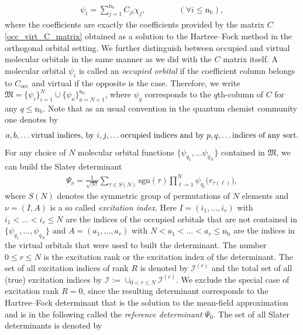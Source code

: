 \documentclass[reqno]{amsart}
\begin{document}
\begin{align}
    \psi_i=\sum_{j=1}^{\text{n}_\text{b}}C_{ji}\chi_j,\qquad \qquad(\forall i\le \text{n}_\text{b}),
\end{align}
where the coefficients are exactly the coefficients provided by the matrix $C$ \eqref{occ_virt_C_matrix} obtained as a solution to the Hartree–Fock method in the orthogonal orbital setting. We further distinguish between occupied and virtual molecular orbitals in the same manner as we did with the $C$ matrix itself. A molecular orbital $\psi_i$ is called an \textit{occupied orbital} if the coefficient column belongs to $C_{\text{occ}}$ and virtual if the opposite is the case. Therefore, we write $\mathfrak{M}=\lbrace \psi_i\rbrace_{i=1}^{N}\cup\lbrace \psi_a\rbrace_{a=N+1}^{\text{n}_\text{b}}$, where $\psi_q$ corresponds to the $q$th-column of $C$ for any $q\le \text{n}_\text{b}$. Note that as an usual convention in the quantum chemist community one denotes by 
\begin{align}\label{indixeing_occ_virt}
    a,b,\ldots \text{virtual indices, by\,\,} i,j,\ldots \text{occupied indices and by }p,q,\ldots \text{indices of any sort.}
\end{align}
For any choice of $N$ molecular orbital functions $\lbrace \psi_{q_1},\ldots\psi_{q_N} \rbrace$ contained in $\mathfrak{M}$, we can build the Slater determinant \begin{align}\label{slater_det}
    \Psi_\nu= \frac{1}{\sqrt{N!}}\sum_{\tau\in S(N)}\text{sgn}(\tau) \prod_{\ell=1}^N \psi_{q_\ell}\big(r_{\tau(\ell)}\big),
\end{align}
where $S(N)$ denotes the symmetric group of permutations of $N$ elements and $\nu=(I,A)$ is a so called \textit{excitation index}. Here $I=(i_1,\ldots,i_r)$ with $i_1<\ldots<i_r\le N$ are the indices of the occupied orbitals that are not contained in $\lbrace \psi_{q_1},\ldots,\psi_{q_N}\rbrace$   and $A=(a_1,\ldots,a_r)$ with $N<a_1<\ldots<a_r\le \text{n}_\text{b}$ are the indices in the virtual orbitals that were used to built the determinant. The number $0\le r \le N$ is the excitation rank or the excitation index of the determinant. The set of all excitation indices of rank $R$ is denoted by $\mathscr{I}^{(r)}$ and the total set of all  (true) excitation indices by $\mathscr{I}:=\cup_{0<r\le N}\mathscr{I}^{(r)}$. We exclude the special case of excitation rank $R=0$, since the resulting determinant corresponds to the Hartree–Fock determinant that is the solution to the mean-field approximation and is in the following called the \textit{reference determinant} $\Psi_0$. The set of all Slater determinants is denoted by
\end{document}
